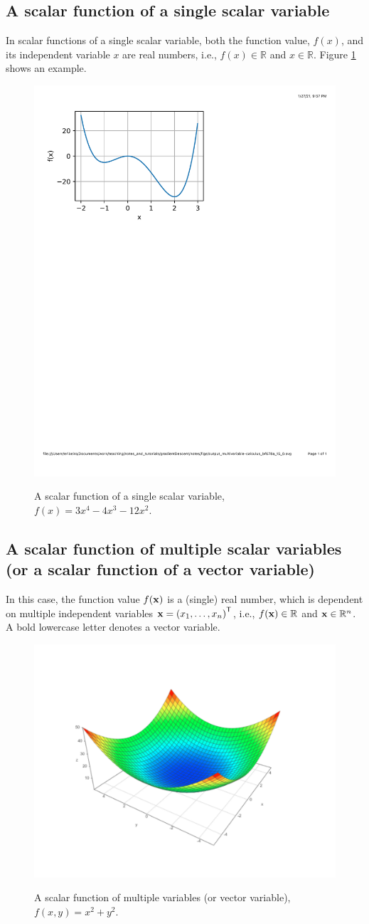 \documentclass[12pt,letter]{article}
\begin{document}
\subsection{A scalar function of a single scalar variable}

In scalar functions of a single scalar variable, both the function value, $f(x)$, and its independent variable $x$ are real numbers, i.e.,  $f(x) \in \mathbb{R}$ and $x \in \mathbb{R}$. Figure \ref{fig_functionType1} shows an example. 	
\begin{figure}[H]
	\begin{center}
		{\includegraphics[width=.50\textwidth]{figs/scalarFunctionScalarVariable}}
	\end{center}
	\caption{A scalar function of a single scalar variable, $f(x) = 3x^4 - 4x^3 - 12x^2$.}
	\label{fig_functionType1}
\end{figure}

\subsection{A scalar function of multiple scalar variables (or a scalar function of a vector variable)}

In this case, the function value $f({\bf x})$ is a (single) real number, which is dependent on multiple  independent variables ${\bf x} = \left(x_1,\hdots,x_n\right)^\mathsf{T}$, i.e.,  $f({\bf x}) \in \mathbb{R}$ and ${\bf x} \in \mathbb{R}^n$. A bold lowercase letter denotes a vector variable.
\begin{figure}[H]
	\begin{center}
		{\includegraphics[width=.50\textwidth]{figs/scalarFunctionMultivariate}}
	\end{center}
	\caption{A scalar function of multiple variables (or vector variable), $f(x,y) = x^2 + y^2$.}
	\label{fig_functionType2}
\end{figure}
	
\end{document}
